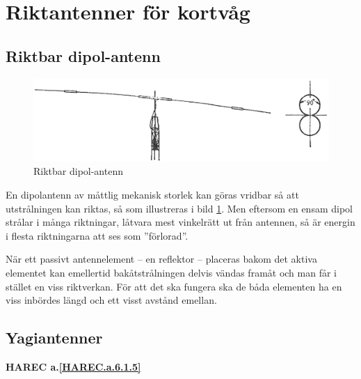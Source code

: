 \section{Riktantenner för kortvåg}

\subsection{Riktbar dipol-antenn}

\begin{figure}
  \includegraphics[width=\textwidth]{images/cropped_pdfs/bild_2_6-17.pdf}
  \caption{Riktbar dipol-antenn}
  \label{fig:bildII6-17}
\end{figure}

En dipolantenn av måttlig mekanisk storlek kan göras vridbar så att
utstrålningen kan riktas, så som illustreras i bild \ref{fig:bildII6-17}.
Men eftersom en ensam dipol strålar i många riktningar, låtvara mest vinkelrätt
ut från antennen, så är energin i flesta riktningarna att ses som ''förlorad''.

När ett passivt antennelement -- en reflektor -- placeras bakom det aktiva
elementet kan emellertid bakåtstrålningen delvis vändas framåt och man får i
stället en viss riktverkan.
För att det ska fungera ska de båda elementen ha en viss inbördes längd och ett
visst avstånd emellan.


\subsection{Yagiantenner}
\textbf{
HAREC a.\ref{HAREC.a.6.1.5}\label{myHAREC.a.6.1.5}
}

